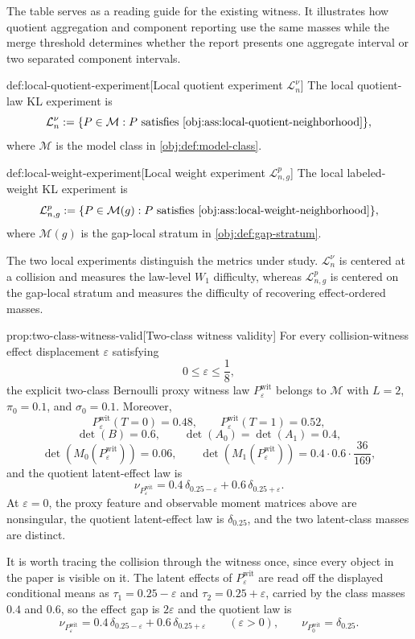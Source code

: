\documentclass[11pt]{article}
\begin{document}
The table serves as a reading guide for the existing witness. It illustrates how quotient aggregation and component reporting use the same masses while the merge threshold determines whether the report presents one aggregate interval or two separated component intervals.

\begin{definitionv}{def:local-quotient-experiment}[Local quotient experiment \(\mathcal L_n^\nu\)]
The local quotient-law KL experiment is
\[
\mathcal L_n^\nu
:=
\{P\in\mathcal M:P\text{ satisfies }\cref{obj:ass:local-quotient-neighborhood}\},
\]
where \(\mathcal M\) is the model class in \cref{obj:def:model-class}.
\end{definitionv}

\begin{definitionv}{def:local-weight-experiment}[Local weight experiment \(\mathcal L_{n,g}^p\)]
The local labeled-weight KL experiment is
\[
\mathcal L_{n,g}^p
:=
\{P\in\mathcal M(g):P\text{ satisfies }\cref{obj:ass:local-weight-neighborhood}\},
\]
where \(\mathcal M(g)\) is the gap-local stratum in \cref{obj:def:gap-stratum}.
\end{definitionv}

The two local experiments distinguish the metrics under study. \(\mathcal L_n^\nu\) is centered at a collision and measures the law-level \(W_1\) difficulty, whereas \(\mathcal L_{n,g}^p\) is centered on the gap-local stratum and measures the difficulty of recovering effect-ordered masses.

\begin{propositionv}{prop:two-class-witness-valid}[Two-class witness validity]
For every collision-witness effect displacement \(\varepsilon\) satisfying
\[
0\le \varepsilon \le \frac18,
\]
the explicit two-class Bernoulli proxy witness law \(P_{\varepsilon}^{\mathrm{wit}}\) belongs to \(\mathcal M\) with \(L=2\), \(\pi_0=0.1\), and \(\sigma_0=0.1\). Moreover,
\[
P_{\varepsilon}^{\mathrm{wit}}(T=0)=0.48,\qquad
P_{\varepsilon}^{\mathrm{wit}}(T=1)=0.52,
\]
\[
\det(B)=0.6,\qquad
\det(A_0)=\det(A_1)=0.4,
\]
\[
\det(M_0(P_{\varepsilon}^{\mathrm{wit}}))=0.06,\qquad
\det(M_1(P_{\varepsilon}^{\mathrm{wit}}))=0.4\cdot 0.6\cdot \frac{36}{169},
\]
and the quotient latent-effect law is
\[
\nu_{P_{\varepsilon}^{\mathrm{wit}}}
=
0.4\,\delta_{0.25-\varepsilon}
+
0.6\,\delta_{0.25+\varepsilon}.
\]
At \(\varepsilon=0\), the proxy feature and observable moment matrices above are nonsingular, the quotient latent-effect law is \(\delta_{0.25}\), and the two latent-class masses are distinct.
\end{propositionv}
It is worth tracing the collision through the witness once, since every object in the paper is visible on it. The latent effects of \(P_{\varepsilon}^{\mathrm{wit}}\) are read off the displayed conditional means as \(\tau_1=0.25-\varepsilon\) and \(\tau_2=0.25+\varepsilon\), carried by the class masses \(0.4\) and \(0.6\), so the effect gap is \(2\varepsilon\) and the quotient law is
\[
\nu_{P^{\mathrm{wit}}_{\varepsilon}}=0.4\,\delta_{0.25-\varepsilon}+0.6\,\delta_{0.25+\varepsilon}
\qquad(\varepsilon>0),
\qquad
\nu_{P^{\mathrm{wit}}_{0}}=\delta_{0.25}.
\]
\end{document}
